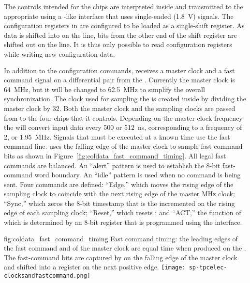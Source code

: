 The controls intended for the   chips are interpreted 
inside  and transmitted to the appropriate  using 
a -like interface that uses single-ended (\SI{1.8}{V})  
signals. The configuration registers in  are configured to be 
loaded as a single-shift register. As data is shifted into  on 
the  line, bits from the other end of the shift register are shifted 
out on the  line. It is thus only possible to read  
configuration registers while writing new configuration data.

In addition to the configuration commands,  %
receives a master clock and a fast command signal on a  
differential pair from
the . Currently the master clock is \SI{64}{MHz}, but it will be
changed to \SI{62.5}{MHz} to simplify the overall   
synchronization. The clock used for sampling the  is created inside
 by dividing the master clock by \num{32}. Both the master clock and
the  sampling clocks are passed from  to the four
 chips that it controls. Depending on the master clock frequency
the  will convert input data every \num{500} or \SI{512}{ns}, 
corresponding to a frequency of \num{2}, or \SI{1.95}{MHz}. Signals that must be executed at a known time use the fast command 
line.  
uses the falling edge of the master clock to sample fast command bits as shown 
in Figure~\ref{fig:coldata_fast_command_timing}. All legal fast commands 
are  balanced. An ``alert'' pattern is used to establish the 8-bit 
fast-command word boundary. An ``idle'' pattern is used when no command is being 
sent. Four commands are defined: ``Edge,'' which moves the rising edge of the 
 sampling clock to coincide with the next rising edge of the 
master MHz clock; ``Sync,'' which zeros the \num{8}-bit timestamp that is the incremented 
on the rising edge of each  sampling clock; ``Reset,'' which resets 
; and ``ACT,'' the function of which is determined by an \num{8}-bit 
register that is programmed using the  interface.  

\begin{dunefigure}
{fig:coldata_fast_command_timing}
{Fast command timing: the leading edges of the fast command and of the master 
clock are equal time when produced on the . The fast-command bits 
are captured by  on the falling edge of the master clock and 
shifted into a register on the next positive edge.}
\texttt{[image: sp-tpcelec-clocksandfastcommand.png]}
\end{dunefigure}

